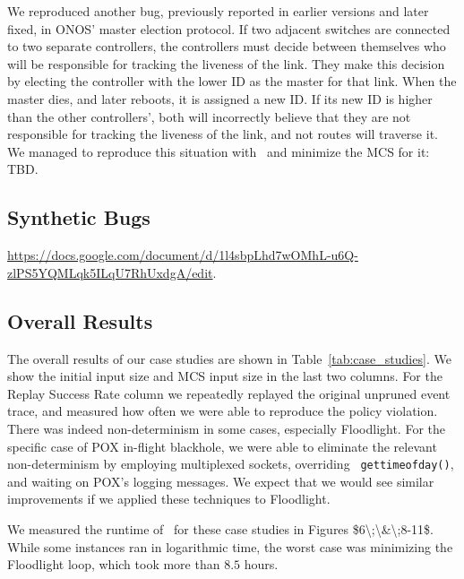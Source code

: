  We reproduced another bug,
previously reported in earlier versions and later fixed, in
ONOS' master election protocol. If two adjacent switches are connected to two
separate controllers, the controllers must decide between themselves who will
be responsible for tracking the liveness of the link. They make this decision
by electing the controller with the lower ID as the master for that link.
When the master dies, and later reboots, it is assigned a new ID. If
its new ID is higher than the other controllers', both will incorrectly
believe that they are not responsible for tracking the liveness of the link,
and not routes will traverse it. We managed to reproduce this situation with
\projectname~and minimize the MCS for it: \num{TBD.}

\subsection{Synthetic Bugs}

\url{https://docs.google.com/document/d/1l4sbpLhd7wOMhL-u6Q-zlPS5YQMLqk5ILqU7RhUxdgA/edit}.

\subsection{Overall Results}

The overall results of our case studies are
shown in Table~\ref{tab:case_studies}.
\num{We show the initial input size and MCS input size in the last two
columns.}
For the Replay Success Rate column we
repeatedly replayed the original unpruned event trace, and measured how often we
were able to reproduce the policy violation. There was indeed non-determinism
in some cases, especially Floodlight. For the specific case of
POX in-flight blackhole, we were able to eliminate the relevant
non-determinism by employing multiplexed sockets, overriding {\tt
gettimeofday()}, and waiting on
POX's logging messages. \num{We expect that we would see similar improvements if we
applied these techniques to Floodlight.}

We measured the runtime of \projectname~for these case studies in Figures
\num{$6\;\&\;8-11$}.
While some instances ran in logarithmic time, the worst case was minimizing
the Floodlight loop,
which took more than $8.5$ hours.

%

